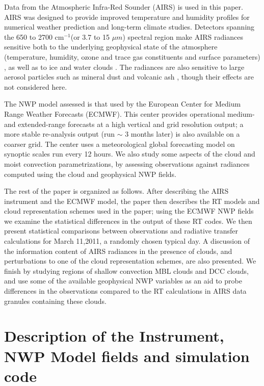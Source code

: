 \documentclass[agupp]{aguplus}              %
\newcommand{\wn}{cm$^{-1}$\xspace}
\newcommand{\um}{$\mu m$\xspace}
\begin{document}
\begin{article}
Data from the Atmospheric Infra-Red Sounder (AIRS) \citep{str:02*1} is
used in this paper. AIRS was designed to provide improved temperature
and humidity profiles for numerical weather prediction and long-term
climate studies. Detectors spanning the 650 to 2700 \wn (or 3.7 to 15
\um) spectral region make AIRS radiances sensitive both to the
underlying geophysical state of the atmosphere (temperature, humidity,
ozone and trace gas constituents and surface parameters)
\citep{aum:02*2,str:02*2}, as well as to ice and water clouds
\citep{kah:03*1,kah:05*1,wu:09}. The radiances are also sensitive to
large aerosol particles such as mineral dust and volcanic ash
\citep{mac:10,cla:10}, though their effects are not considered here.

The NWP model assessed is that used by the European Center for Medium
Range Weather Forecasts (ECMWF). This center provides operational
medium- and extended-range forecasts at a high vertical and grid
resolution output; a more stable re-analysis output (run $\sim$ 3
months later) is also available on a coarser grid.  The center uses a
meteorological global forecasting model on synoptic scales run
every 12 hours.  We also study some aspects of the cloud
and moist convection parametrizations, by assessing observations against 
radiances computed using the cloud and geophysical NWP fields.

The rest of the paper is organized as follows. After describing the
AIRS instrument and the ECMWF model, the paper then describes the RT
models and cloud representation schemes used in the paper; using the
ECMWF NWP fields we examine the statistical differences in the output
of these RT codes. We then present statistical comparisons
between observations and radiative transfer calculations for March
11,2011, a randomly chosen typical day. A discussion of the
information content of AIRS radiances in the presence of clouds, and
perturbations to one of the cloud representation schemes, are also
presented. We finish by studying regions of shallow convection MBL clouds
and DCC clouds, and use some of the available geophysical NWP
variables as an aid to probe differences in the observations compared
to the RT calculations in AIRS data granules containing these clouds.

\section{Description of the Instrument, NWP Model fields and simulation code}


\end{article}
\end{document}
